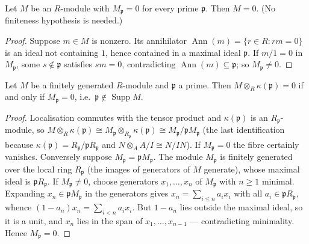 \begin{lemma}
  \label{pa-lem:zero_of_forall_localization_zero}
  \leanok

  Let \(M\) be an \(R\)-module with \(M_{\mathfrak p} = 0\) for every prime
  \(\mathfrak p\). Then \(M = 0\). (No finiteness hypothesis is needed.)
\end{lemma}
\begin{proof}
  \leanok
  Suppose \(m \in M\) is nonzero. Its annihilator
  \(\operatorname{Ann}(m) = \{r \in R : rm = 0\}\) is an ideal not containing \(1\),
  hence contained in a maximal ideal \(\mathfrak p\). If \(m/1 = 0\) in
  \(M_{\mathfrak p}\), some \(s \notin \mathfrak p\) satisfies \(sm = 0\),
  contradicting \(\operatorname{Ann}(m) \subseteq \mathfrak p\); so
  \(M_{\mathfrak p} \neq 0\).
\end{proof}

\begin{lemma}
  \label{pa-lem:fibre_vanishing_iff_localization_zero}
  \leanok

  Let \(M\) be a finitely generated \(R\)-module and \(\mathfrak p\) a prime. Then
  \(M \otimes_R \kappa(\mathfrak p) = 0\) if and only if \(M_{\mathfrak p} = 0\), i.e.\
  \(\mathfrak p \notin \operatorname{Supp} M\).
\end{lemma}
\begin{proof}
  \leanok
  Localisation commutes with the tensor product and \(\kappa(\mathfrak p)\) is an
  \(R_{\mathfrak p}\)-module, so
  \(M \otimes_R \kappa(\mathfrak p) \cong M_{\mathfrak p} \otimes_{R_{\mathfrak p}}
  \kappa(\mathfrak p) \cong M_{\mathfrak p}/\mathfrak p M_{\mathfrak p}\)
  (the last identification because \(\kappa(\mathfrak p) =
  R_{\mathfrak p}/\mathfrak p R_{\mathfrak p}\) and \(N \otimes_A A/I \cong N/IN\)).
  If \(M_{\mathfrak p} = 0\) the fibre certainly vanishes. Conversely suppose
  \(M_{\mathfrak p} = \mathfrak p M_{\mathfrak p}\). The module \(M_{\mathfrak p}\) is
  finitely generated over the local ring \(R_{\mathfrak p}\) (the images of generators
  of \(M\) generate), whose maximal ideal is \(\mathfrak p R_{\mathfrak p}\). If
  \(M_{\mathfrak p} \neq 0\), choose generators \(x_1, \dots, x_n\) of
  \(M_{\mathfrak p}\) with \(n \geq 1\) minimal. Expanding
  \(x_n \in \mathfrak p M_{\mathfrak p}\) in the generators gives
  \(x_n = \sum_{i \leq n} a_i x_i\) with all
  \(a_i \in \mathfrak p R_{\mathfrak p}\), whence
  \((1 - a_n) x_n = \sum_{i < n} a_i x_i\). But \(1 - a_n\) lies outside the maximal
  ideal, so it is a unit, and \(x_n\) lies in the span of \(x_1, \dots, x_{n-1}\) ---
  contradicting minimality. Hence \(M_{\mathfrak p} = 0\).
\end{proof}

